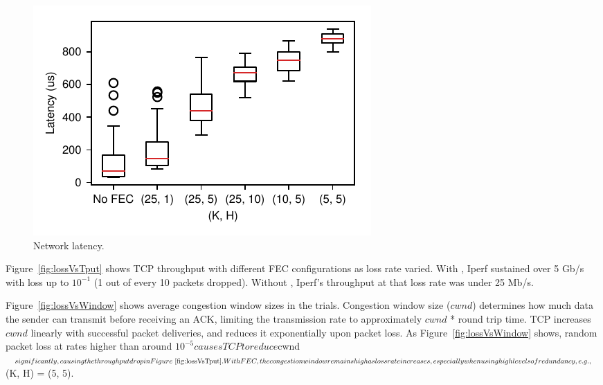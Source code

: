 \begin{figure}[!ht]
\begin{minipage}[b]{0.32\linewidth}
\includegraphics[width=\textwidth]{figures/latency.pdf}
\caption{Network latency.}
\label{fig:latency}
\end{minipage}
\end{figure}




Figure~\ref{fig:lossVsTput} shows TCP throughput with different FEC
configurations as loss rate varied. With \OurSys, Iperf sustained  over 5 Gb/s
with loss up to $10^{-1}$ (1 out of every 10 packets dropped). Without
\OurSys, Iperf's throughput at that loss rate was under 25 Mb/s. 

Figure~\ref{fig:lossVsWindow} shows average congestion window sizes in 
the trials. Congestion window size ($cwnd$) determines how much data the sender 
can transmit before receiving an ACK, limiting the transmission rate 
to approximately $cwnd$ * round trip time. TCP increases $cwnd$ linearly 
with successful packet deliveries, and reduces it exponentially upon 
packet loss. As Figure~\ref{fig:lossVsWindow} shows, random packet loss 
at rates higher than around $10^{-5} causes TCP to reduce $cwnd$ significantly, 
causing the throughput drop in Figure~\ref{fig:lossVsTput}. With FEC, 
the congestion window remains high as loss rate increases, especially when 
using high levels of redundancy, e.g., $(K, H) = (5, 5). 

